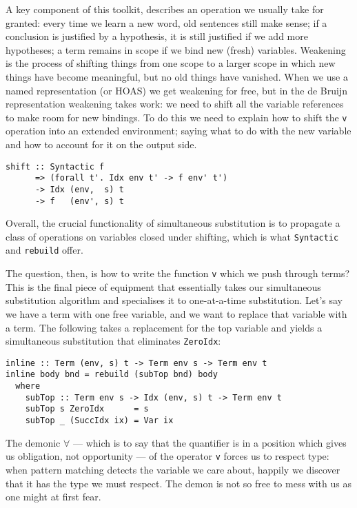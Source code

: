 A key component of this toolkit,  describes an operation we
usually take for granted: every time we learn a new word, old sentences still
make sense; if a conclusion is justified by a hypothesis, it is still justified
if we add more hypotheses; a term remains in scope if we bind new (fresh)
variables. Weakening is the process of shifting things from one scope to a
larger scope in which new things have become meaningful, but no old things have
vanished. When we use a named representation (or HOAS) we get
weakening for free, but in the de Bruijn representation
weakening takes work: we need to shift all the variable references to make room
for new bindings. To do this we need to explain how to shift the \texttt{v}
operation into an extended environment; saying what to do with the new variable
and how to account for it on the output side.
%
\begin{lstlisting}[style=haskell]
shift :: Syntactic f
      => (forall t'. Idx env t' -> f env' t')
      -> Idx (env,  s) t
      -> f   (env', s) t
\end{lstlisting}
%
Overall, the crucial functionality of simultaneous substitution is to propagate
a class of operations on variables closed under shifting, which is what
\texttt{Syntactic} and \texttt{rebuild} offer.

The question, then, is how to write the function \texttt{v} which we push
through terms? This is the final piece of equipment that essentially takes our
simultaneous substitution algorithm and specialises it to one-at-a-time
substitution. Let's say we have a term with one free variable, and we want to
replace that variable with a term. The following takes a replacement for the top
variable and yields a simultaneous substitution that eliminates
\texttt{ZeroIdx}:
%
\begin{lstlisting}[style=haskell,caption={A simultaneous substitution to inline terms}]
inline :: Term (env, s) t -> Term env s -> Term env t
inline body bnd = rebuild (subTop bnd) body
  where
    subTop :: Term env s -> Idx (env, s) t -> Term env t
    subTop s ZeroIdx      = s
    subTop _ (SuccIdx ix) = Var ix
\end{lstlisting}
%
The demonic $\forall$ --- which is to say that the quantifier is in a position
which gives us obligation, not opportunity --- of the operator \texttt{v} forces
us to respect type: when pattern matching detects the variable we care about,
happily we discover that it has the type we must respect. The demon is not so
free to mess with us as one might at first fear.

